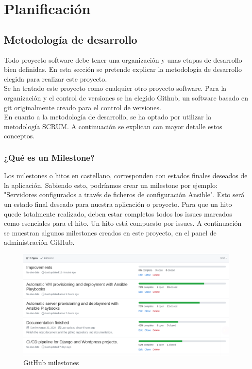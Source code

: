 \chapter {Planificación}

\section{Metodología de desarrollo}
\begin{text}
	Todo proyecto software debe tener una organización y unas etapas de desarrollo bien definidas. En esta sección se pretende explicar la metodología de desarrollo elegida para realizar este proyecto. \\
	Se ha tratado este proyecto como cualquier otro proyecto software. Para la organización y el control de versiones se ha elegido Github, un software basado en git originalmente creado para el control de versiones. \\
	En cuanto a la metodología de desarrollo, se ha optado por utilizar la metodología SCRUM. A continuación se explican con mayor detalle estos conceptos.
\end{text}

\subsection{¿Qué es un Milestone?}
\label{milestones}
\begin{text}
	Los milestones o hitos en castellano, corresponden con estados finales deseados de la aplicación. Sabiendo esto, podríamos crear un milestone por ejemplo: "Servidores configurados a través de ficheros de configuración Ansible". Esto será un estado final deseado para nuestra aplicación o proyecto. Para que un hito quede totalmente realizado, deben estar completos todos los issues marcados como esenciales para el hito. Un hito está compuesto por issues. A continuación se muestran algunos milestones creados en este proyecto, en el panel de administración GitHub.
	
	\clearpage
	
	\begin{figure}[!hbt]
		\centering
		\includegraphics[scale=0.37]{imagenes/Analisis/milestones.png}
		\caption[GitHub milestones]{GitHub milestones \cite{github-issue}}
		\label{github_milestones}
	\end{figure}
\end{text}

